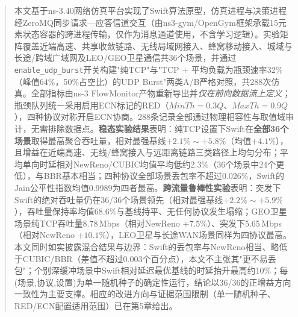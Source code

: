 \begin{abstract}
本文基于ns-3.40网络仿真平台实现了Swift算法原型，仿真进程与决策进程经ZeroMQ同步请求—应答信道交互（由ns3-gym/OpenGym框架承载15元素状态容器的跨进程传输，仅作为消息通道使用，不含学习逻辑）。实验矩阵覆盖近端高速、共享收敛链路、无线局域网接入、蜂窝移动接入、城域与长途/跨域广域网及LEO/GEO卫星通信共36个场景，并通过\texttt{enable\_udp\_burst}开关构建"纯TCP"与"TCP $+$ 平均负载为瓶颈速率32\%（峰值64\%，50\%占空比）的UDP Burst"两类A/B严格对照，共288次仿真。全部指标由ns-3 FlowMonitor产物重新导出并\emph{仅在前向数据流上定义}；瓶颈队列统一采用启用ECN标记的RED（$MinTh=0.3Q$、$MaxTh=0.9Q$），四种协议对称开启ECN协商。288条记录全部通过物理相容性与取值域审计，无需排除数据点。\textbf{稳态实验结果}表明：纯TCP设置下Swift在\textbf{全部36个场景}取得最高聚合吞吐量，相对最强基线$+2.1\%\sim+5.8\%$（均值$+4.1\%$），且增益在近端高速、无线/蜂窝接入与远距离链路三类路径上均匀分布；平均单向时延相对NewReno/CUBIC均值平均低约2.3\%（36个场景中24个更低），与BBR基本相当；四种协议全部场景丢包率不超过0.026\%，Swift的Jain公平性指数均值0.9989为四者最高。\textbf{跨流量鲁棒性实验}表明：突发下Swift的绝对吞吐量仍在36/36个场景领先（相对最强基线$+2.2\%\sim+5.9\%$），吞吐量保持率均值68.6\%与基线持平、无任何协议发生塌缩；GEO卫星场景纯TCP吞吐量8.78\,Mbps（相对NewReno $+7.5\%$）、突发下5.65\,Mbps（相对NewReno $+10.1\%$），LEO卫星与长途WAN场景同样为四协议最高。本文同时如实披露混合结果与边界：Swift的丢包率与NewReno相当、略低于CUBIC/BBR（差值不超过0.003个百分点），本文不主张其"更不易丢包"；个别深缓冲场景中Swift相对延迟最优基线的时延抬升最高约10\%；每(场景,协议,设置)为单一随机种子的确定性运行，结论以36/36的正增益方向一致性为主要支撑。相应的改进方向与证据范围限制（单一随机种子、RED/ECN配置适用范围）已在第5章给出。

\end{abstract}

